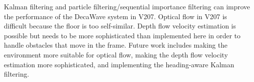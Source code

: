 Kalman filtering and particle filtering/sequential importance filtering can improve the performance
of the DecaWave system in V207.
Optical flow in V207 is difficult because the floor is too self-similar.
Depth flow velocity estimation is possible but needs to be more sophisticated than implemented here
in order to handle obstacles that move in the frame.
Future work includes making the environment more suitable for optical flow, making the depth flow
velocity estimation more sophisticated, and implementing the heading-aware Kalman filtering.
